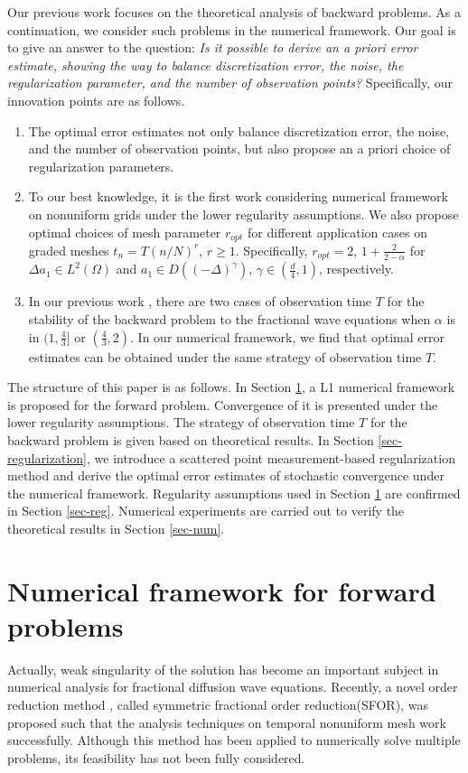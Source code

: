 \documentclass[11pt]{article}
\numberwithin{equation}{section}
\begin{document}
Our previous work focuses on the theoretical analysis of backward problems. As a continuation, we consider such problems in the numerical framework. Our goal is to give an answer to the question: \textit{Is it possible to derive an a priori error estimate, showing the way to balance discretization error, the noise, the regularization parameter, and the number of observation points?}
Specifically, our innovation points are as follows.
\begin{enumerate}
    \item The optimal error estimates not only balance discretization error, the noise, and the number of observation points, but also propose an a priori choice of regularization parameters.

    \item To our best knowledge, it is the first work considering numerical framework on nonuniform grids under the lower regularity assumptions. We also propose optimal choices of mesh parameter $r_{opt}$ for different application cases on graded meshes $t_n=T(n/N)^r$, $r\ge1$. Specifically, $r_{opt}=2$, $1+\frac{2}{2-\alpha}$ for $\Delta a_1\in L^2(\Omega)$ and $a_1\in D((-\Delta)^{\gamma})$, $\gamma\in(\frac{d}{4},1)$, respectively.
    
    \item In our previous work \cite{LiZhang2024}, there are two cases of observation time $T$ for the stability of the backward problem to the fractional wave equations when $\alpha$ is in $(1, \frac{4}{3}]$ or $(\frac{4}{3},2)$. In our numerical framework, we find that optimal error estimates can be obtained under the same strategy of observation time $T$.
    
\end{enumerate} 

The structure of this paper is as follows. In Section \ref{frame-forward}, a L1 numerical framework is proposed for the forward problem. Convergence of it is presented under the lower regularity assumptions. The strategy of observation time $T$ for the backward problem is given based on theoretical results. In Section \ref{sec-regularization}, we introduce a scattered point measurement-based regularization method and derive the optimal error estimates of stochastic convergence under the numerical framework. Regularity assumptions used in Section \ref{frame-forward} are confirmed in Section \ref{sec-reg}. Numerical experiments are carried out to verify the theoretical results in Section \ref{sec-num}.

\section{Numerical framework for forward problems}\label{frame-forward}
Actually, weak singularity of the solution has become an important subject in numerical analysis for fractional diffusion wave equations. Recently, a novel order reduction method \cite{LyuP2022SFOR}, called symmetric fractional order reduction(SFOR), was proposed such that the analysis techniques \cite{LiaoH2018L1,LiaoH2021L2_1} on temporal nonuniform mesh work successfully. Although this method has been applied to numerically solve multiple problems, its feasibility has not been fully considered. 
\end{document}
